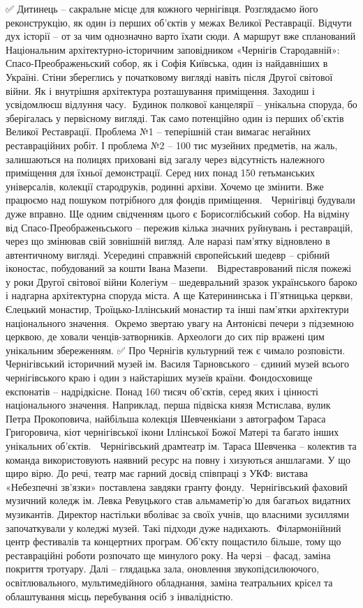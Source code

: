 ✅ Дитинець – сакральне місце для кожного чернігівця. Розглядаємо його реконструкцію, як один із перших об’єктів у межах Великої Реставрації. Відчути дух історії – от за чим однозначно варто їхати сюди. А маршрут вже спланований Національним архітектурно-історичним заповідником «Чернігів Стародавній»:
📍 Спасо-Преображеньский собор, як і Софія Київська, один із найдавніших в Україні. Стіни збереглись у початковому вигляді навіть після Другої світової війни. Як і внутрішня архітектура розташування приміщення. Заходиш і усвідомлюєш відлуння часу. 
📍Будинок полкової канцелярії – унікальна споруда, бо зберігалась у первісному вигляді. Так само потенційно один із перших об’єктів Великої Реставрації. Проблема №1 – теперішній стан вимагає негайних реставраційних робіт. І проблема №2 – 100 тис музейних предметів, на жаль, залишаються на полицях приховані від загалу через відсутність належного приміщення для їхньої демонстрації. Серед них понад 150 гетьманських універсалів, колекції стародруків, родинні архіви. Хочемо це змінити. Вже працюємо над пошуком потрібного для фондів приміщення. 
📍 Чернігівці будували дуже вправно. Ще одним свідченням цього є Борисоглібський собор. На відміну від Спасо-Преображеньського – пережив кілька значних руйнувань і реставрацій, через що змінював свій зовнішній вигляд. Але наразі пам’ятку відновлено в автентичному вигляді. Усередині справжній європейський шедевр – срібний іконостас, побудований за кошти Івана Мазепи.
📍 Відреставрований після пожежі у роки Другої світової війни Колегіум – шедевральний зразок українського бароко і надгарна архітектурна споруда міста. А ще Катерининська і П’ятницька церкви, Єлецький монастир, Троїцько-Іллінський монастир та інші пам’ятки архітектури національного значення. 
📍Окремо звертаю увагу на Антонієві печери з підземною церквою, де ховали ченців-затворників. Археологи до сих пір вражені цим унікальним збереженням.
✅ Про Чернігів культурний теж є чимало розповісти. 
📍Чернігівський історичний музей ім. Василя Тарновського – єдиний музей всього чернігівського краю і один з найстаріших музеїв країни. Фондосховище експонатів – надрідкісне. Понад 160 тисяч об’єктів, серед яких і цінності національного значення. Наприклад, перша підвіска князя Мстислава, вулик Петра Прокоповича, найбільша колекція Шевченкіани з автографом Тараса Григоровича, кіот чернігівської ікони Іллінської Божої Матері та багато інших унікальних об’єктів.
📍 Чернігівський драмтеатр ім. Тараса Шевченка – колектив та команда використовують наявний ресурс на повну і хизуються аншлагами. У що щиро вірю. До речі, театр має гарний досвід співпраці з УКФ: вистава «Небезпечні зв’язки» поставлена завдяки гранту фонду.
📍Чернігівський фаховий музичний коледж ім. Левка Ревуцького став альмаметір’ю для багатьох видатних музикантів. Директор настільки вболіває за своїх учнів, що власними зусиллями започаткували у коледжі музей. Такі підходи дуже надихають.
📍Філармонійний центр фестивалів та концертних програм. Об’єкту пощастило більше, тому що реставраційні роботи розпочато ще минулого року. На черзі – фасад, заміна покриття тротуару. Далі – глядацька зала, оновлення звукопідсилюючого, освітлювального, мультимедійного обладнання, заміна театральних крісел та облаштування місць перебування осіб з інвалідністю.


